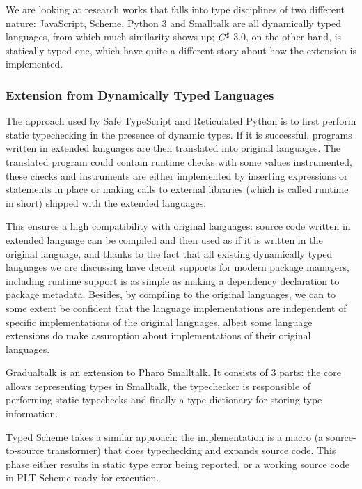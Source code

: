 We are looking at research works that falls into type disciplines of two different nature:
JavaScript, Scheme, Python 3 and Smalltalk are all dynamically typed languages, from which
much similarity shows up;
$C^\sharp$ 3.0, on the other hand, is statically typed one,
which have quite a different story about how the extension is implemented.

\subsubsection{Extension from Dynamically Typed Languages}

The approach used by Safe TypeScript and Reticulated Python
is to first perform static typechecking in the presence of dynamic types.
If it is successful, programs written in extended languages are then translated into original languages.
The translated program could contain runtime checks with some values instrumented,
these checks and instruments are either implemented by inserting expressions or statements in place or
making calls to external libraries (which is called runtime in short) shipped with
the extended languages.

This ensures a high compatibility with original languages: source code written in extended language
can be compiled and then used as if it is written in the original language, and thanks to the fact
that all existing dynamically typed languages
we are discussing have decent supports for modern package managers,
including runtime support is as simple as making a dependency declaration to package metadata.
Besides, by compiling to the original languages,
we can to some extent be confident that the language implementations
are independent of specific implementations of the original languages,
albeit some language extensions do make assumption about implementations of their original languages.



Gradualtalk is an extension to Pharo Smalltalk. It consists of 3 parts:
the core allows representing types in Smalltalk, the typechecker
is responsible of performing static typechecks and finally
a type dictionary for storing type information.

Typed Scheme takes a similar approach: the implementation is a macro
(a source-to-source transformer) that does typechecking and expands source code.
This phase either results in static type error being reported,
or a working source code in PLT Scheme ready for execution.

